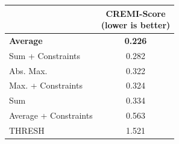 \begin{figure}[t]
        \centering
\begin{minipage}[t]{0.56\textwidth}
    \centering
    \scriptsize
        \begin{tabular}[t]{l|c}
          & \makecell{CREMI-Score \\(lower is better)} \\ \midrule 
\textbf{\algname{}} \textbf{Average}& \textbf{0.226}  \\
\algname{} Sum + Constraints \cite{levinkov2017comparative} & 0.282 \\
\algname{} Abs. Max. \cite{wolf2018mutex} & 0.322 \\
\algname{} Max. + Constraints & 0.324 \\
\algname{} Sum \cite{keuper2015efficient} & 0.334 \\
\algname{} Average + Constraints & 0.563 \\
THRESH & 1.521 \\ 

\end{tabular}
\end{minipage}
\end{figure}

